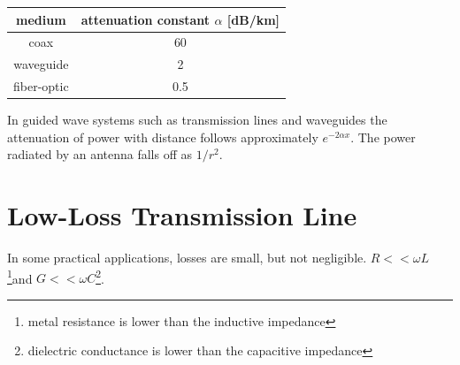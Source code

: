 \documentclass{ximera}
\begin{document}
\begin{center}
\begin{tabular}{|c|c|} \hline
medium     & attenuation constant $\alpha$ [dB/km]     \\  \hline       
coax        & 60                                 \\ \hline
 waveguide  & 2  \\ \hline          
fiber-optic &  0.5  \\ \hline
\end{tabular}
\end{center}


In guided wave systems such as transmission lines and waveguides the attenuation of power with distance follows approximately $e^{-2\alpha x}$. The power radiated by an antenna falls off as $1/r^{2}$.

\section{Low-Loss Transmission Line}




In some practical applications, losses are small, but not negligible.  $R<< \omega L$ \footnote{metal resistance is
lower than the inductive impedance}and $G <<  \omega C$\footnote{dielectric conductance is lower than the capacitive impedance}. 
\end{document}
